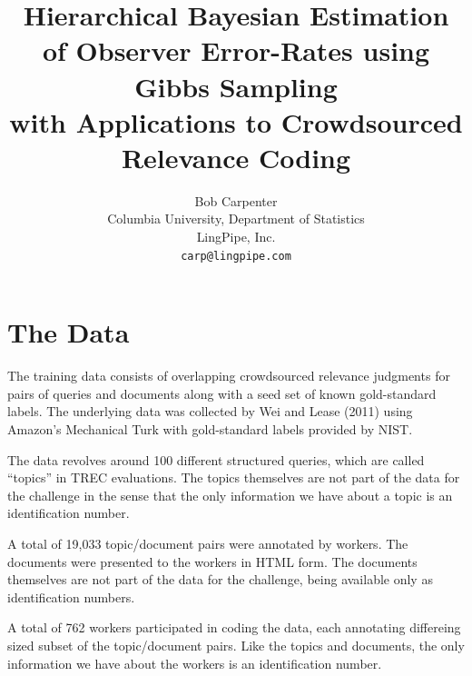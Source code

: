 \documentclass{article}
\title{Hierarchical Bayesian Estimation of Observer Error-Rates using
Gibbs Sampling
\\[4pt]
{\Large with Applications to Crowdsourced Relevance Coding}}
\author{Bob Carpenter
\\[4pt] Columbia University, Department of Statistics
\\[4pt] LingPipe, Inc.
\\[4pt] \texttt{carp@lingpipe.com}}
\begin{document}
\maketitle



\section{The Data}

The training data consists of overlapping crowdsourced relevance
judgments for pairs of queries and documents along with a seed set of
known gold-standard labels.  The underlying data was
collected by Wei and Lease (2011) using Amazon's Mechanical Turk 
with gold-standard labels provided by NIST.

The data revolves around 100 different structured queries, which are
called ``topics'' in TREC evaluations.  The topics themselves are not
part of the data for the challenge in the sense that the only
information we have about a topic is an identification number.

A total of 19,033 topic/document pairs were annotated by workers.  The
documents were presented to the workers in HTML form.  The documents
themselves are not part of the data for the challenge, being available
only as identification numbers.

A total of 762 workers participated in coding the data, each
annotating differeing sized subset of the topic/document pairs.  Like
the topics and documents, the only information we have about the
workers is an identification number.
\end{document}
